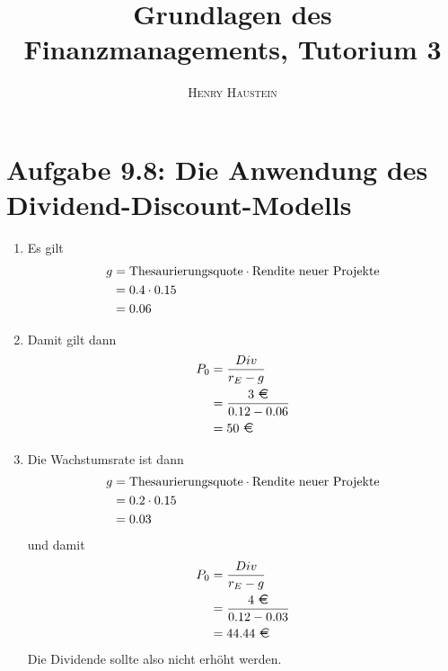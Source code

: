 \documentclass{article}
\title{\textbf{Grundlagen des Finanzmanagements, Tutorium 3}}
\author{\textsc{Henry Haustein}}
\date{}
\begin{document}
	\maketitle
	
	\section*{Aufgabe 9.8: Die Anwendung des Dividend-Discount-Modells}
	\begin{enumerate}[label=(\alph*)]
		\item Es gilt
		\begin{align}
			g &= \text{Thesaurierungsquote} \cdot \text{Rendite neuer Projekte} \notag \\
			&= 0.4 \cdot 0.15 \notag \\
			&= 0.06 \notag
		\end{align}
		\item Damit gilt dann
		\begin{align}
			P_0 &= \frac{Div}{r_E - g} \notag \\
			&= \frac{3\text{ \EUR}}{0.12-0.06} \notag \\
			&= 50 \text{ \EUR} \notag
		\end{align}
		\item Die Wachstumsrate ist dann
		\begin{align}
			g &= \text{Thesaurierungsquote} \cdot \text{Rendite neuer Projekte} \notag \\
			&= 0.2 \cdot 0.15 \notag \\
			&= 0.03 \notag
		\end{align}
		und damit
		\begin{align}
			P_0 &= \frac{Div}{r_E - g} \notag \\
			&= \frac{4\text{ \EUR}}{0.12-0.03} \notag \\
			&= 44.44 \text{ \EUR} \notag
		\end{align}
		Die Dividende sollte also nicht erhöht werden.
	\end{enumerate}
	
\end{document}
